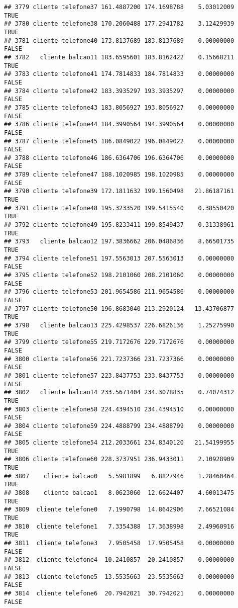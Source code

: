 \documentclass[
]{article}
\begin{document}
\begin{verbatim}
## 3779 cliente telefone37 161.4887200 174.1698788    5.03012009     TRUE
## 3780 cliente telefone38 170.2060488 177.2941782    3.12429939     TRUE
## 3781 cliente telefone40 173.8137689 183.8137689    0.00000000    FALSE
## 3782   cliente balcao11 183.6595601 183.8162422    0.15668211     TRUE
## 3783 cliente telefone41 174.7814833 184.7814833    0.00000000    FALSE
## 3784 cliente telefone42 183.3935297 193.3935297    0.00000000    FALSE
## 3785 cliente telefone43 183.8056927 193.8056927    0.00000000    FALSE
## 3786 cliente telefone44 184.3990564 194.3990564    0.00000000    FALSE
## 3787 cliente telefone45 186.0849022 196.0849022    0.00000000    FALSE
## 3788 cliente telefone46 186.6364706 196.6364706    0.00000000    FALSE
## 3789 cliente telefone47 188.1020985 198.1020985    0.00000000    FALSE
## 3790 cliente telefone39 172.1811632 199.1560498   21.86187161     TRUE
## 3791 cliente telefone48 195.3233520 199.5415540    0.38550420     TRUE
## 3792 cliente telefone49 195.8233411 199.8549437    0.31338961     TRUE
## 3793   cliente balcao12 197.3836662 206.0486836    8.66501735     TRUE
## 3794 cliente telefone51 197.5563013 207.5563013    0.00000000    FALSE
## 3795 cliente telefone52 198.2101060 208.2101060    0.00000000    FALSE
## 3796 cliente telefone53 201.9654586 211.9654586    0.00000000    FALSE
## 3797 cliente telefone50 196.8683040 213.2920124   13.43706877     TRUE
## 3798   cliente balcao13 225.4298537 226.6826136    1.25275990     TRUE
## 3799 cliente telefone55 219.7172676 229.7172676    0.00000000    FALSE
## 3800 cliente telefone56 221.7237366 231.7237366    0.00000000    FALSE
## 3801 cliente telefone57 223.8437753 233.8437753    0.00000000    FALSE
## 3802   cliente balcao14 233.5671404 234.3078835    0.74074312     TRUE
## 3803 cliente telefone58 224.4394510 234.4394510    0.00000000    FALSE
## 3804 cliente telefone59 224.4888799 234.4888799    0.00000000    FALSE
## 3805 cliente telefone54 212.2033661 234.8340120   21.54199955     TRUE
## 3806 cliente telefone60 228.3737951 236.9433011    2.10928909     TRUE
## 3807    cliente balcao0   5.5981899   6.8827946    1.28460464     TRUE
## 3808    cliente balcao1   8.0623060  12.6624407    4.60013475     TRUE
## 3809  cliente telefone0   7.1990798  14.8642906    7.66521084     TRUE
## 3810  cliente telefone1   7.3354388  17.3638998    2.49960916     TRUE
## 3811  cliente telefone3   7.9505458  17.9505458    0.00000000    FALSE
## 3812  cliente telefone4  10.2410857  20.2410857    0.00000000    FALSE
## 3813  cliente telefone5  13.5535663  23.5535663    0.00000000    FALSE
## 3814  cliente telefone6  20.7942021  30.7942021    0.00000000    FALSE

\end{verbatim}
\end{document}
